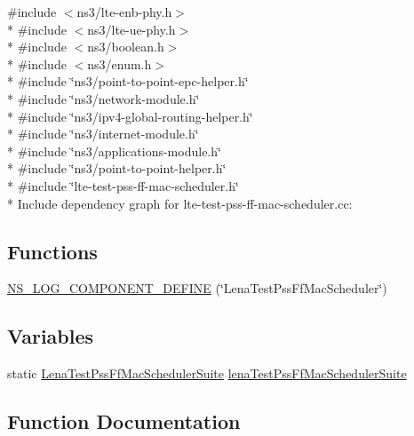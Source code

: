 {\ttfamily \#include $<$ns3/lte-\/enb-\/phy.\+h$>$}\\*
{\ttfamily \#include $<$ns3/lte-\/ue-\/phy.\+h$>$}\\*
{\ttfamily \#include $<$ns3/boolean.\+h$>$}\\*
{\ttfamily \#include $<$ns3/enum.\+h$>$}\\*
{\ttfamily \#include \char`\"{}ns3/point-\/to-\/point-\/epc-\/helper.\+h\char`\"{}}\\*
{\ttfamily \#include \char`\"{}ns3/network-\/module.\+h\char`\"{}}\\*
{\ttfamily \#include \char`\"{}ns3/ipv4-\/global-\/routing-\/helper.\+h\char`\"{}}\\*
{\ttfamily \#include \char`\"{}ns3/internet-\/module.\+h\char`\"{}}\\*
{\ttfamily \#include \char`\"{}ns3/applications-\/module.\+h\char`\"{}}\\*
{\ttfamily \#include \char`\"{}ns3/point-\/to-\/point-\/helper.\+h\char`\"{}}\\*
{\ttfamily \#include \char`\"{}lte-\/test-\/pss-\/ff-\/mac-\/scheduler.\+h\char`\"{}}\\*
Include dependency graph for lte-\/test-\/pss-\/ff-\/mac-\/scheduler.cc\+:
\subsection*{Functions}
\begin{DoxyCompactItemize}
\item 
\hyperlink{lte-test-pss-ff-mac-scheduler_8cc_a78a374346098ec455bb5ca9512db896d}{N\+S\+\_\+\+L\+O\+G\+\_\+\+C\+O\+M\+P\+O\+N\+E\+N\+T\+\_\+\+D\+E\+F\+I\+NE} (\char`\"{}Lena\+Test\+Pss\+Ff\+Mac\+Scheduler\char`\"{})
\end{DoxyCompactItemize}
\subsection*{Variables}
\begin{DoxyCompactItemize}
\item 
static \hyperlink{classLenaTestPssFfMacSchedulerSuite}{Lena\+Test\+Pss\+Ff\+Mac\+Scheduler\+Suite} \hyperlink{lte-test-pss-ff-mac-scheduler_8cc_a41ef89654b36a2197e6aa944a5354734}{lena\+Test\+Pss\+Ff\+Mac\+Scheduler\+Suite}
\end{DoxyCompactItemize}


\subsection{Function Documentation}

